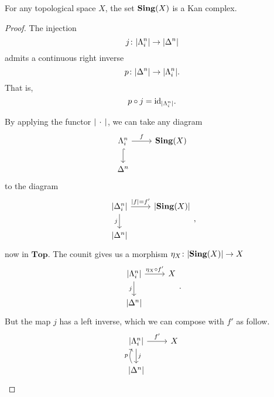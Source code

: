 \documentclass[main.tex]{subfiles}
\begin{document}
\begin{theorem}
  For any topological space $X$, the set $\mathbf{Sing}(X)$ is a Kan complex.
\end{theorem}
\begin{proof}
  The injection
  \begin{equation*}
    j\colon {| \Lambda^{n}_{i} |} \to {| \Delta^{n} |}
  \end{equation*}
  admits a continuous right inverse
  \begin{equation*}
    p\colon {| \Delta^{n} |} \to {| \Lambda^{n}_{i} |}.
  \end{equation*}
  That is,
  \begin{equation*}
    p \circ j = \mathrm{id}_{{| \Lambda^{n}_{i} |}}.
  \end{equation*}

  By applying the functor ${| \,\cdot\, |}$, we can take any diagram
  \begin{equation*}
    \begin{tikzcd}
      \Lambda^{n}_{i}
      \arrow[r, "f"]
      \arrow[d, hookrightarrow]
      & \Sing(X)
      \\
      \Delta^{n}
    \end{tikzcd}
  \end{equation*}
  to the diagram
  \begin{equation*}
    \begin{tikzcd}
      \abs{\Delta^{n}_{i}}
      \arrow[r, "\abs{f} = f'"]
      \arrow[d, swap, "j"]
      &\abs{\Sing(X)}
      \\
      \abs{\Delta^{n}}
    \end{tikzcd},
  \end{equation*}
  now in $\mathbf{Top}$. The counit gives us a morphism $\eta_{X}\colon {| \mathbf{Sing}(X) |} \to X$
  \begin{equation*}
    \begin{tikzcd}
      \abs{\Lambda^{n}_{i}}
      \arrow[r, "\eta_{X} \circ f'"]
      \arrow[d, swap, "j"]
      &X
      \\
      \abs{\Delta^{n}}
    \end{tikzcd}.
  \end{equation*}
  But the map $j$ has a left inverse, which we can compose with $f'$ as follow.
  \begin{equation*}
    \begin{tikzcd}
      \abs{\Lambda^{n}_{i}}
      \arrow[r, "f'"]
      \arrow[d, "j"]
      & X
      \\
      \abs{\Delta^{n}}
      \arrow[u, bend left, "p"]

\end{tikzcd}
\end{equation*}
\end{proof}
\end{document}
